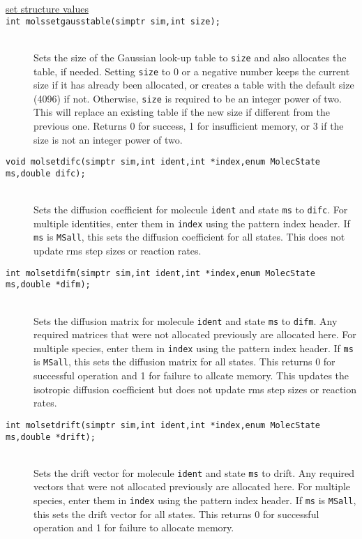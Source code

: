 \documentclass {scrbook}
\newcommand {\ttt} {\texttt}
\begin{document}
\begin{description}
\item[\underline{set structure values}]

\item[\ttt{int molssetgausstable(simptr sim,int size);}]
\hfill \\
Sets the size of the Gaussian look-up table to \ttt{size} and also allocates the table, if needed. Setting \ttt{size} to 0 or a negative number keeps the current size if it has already been allocated, or creates a table with the default size (4096) if not. Otherwise, \ttt{size} is required to be an integer power of two. This will replace an existing table if the new size if different from the previous one. Returns 0 for success, 1 for insufficient memory, or 3 if the size is not an integer power of two.

\item[\ttt{void molsetdifc(simptr sim,int ident,int *index,enum MolecState ms,double difc);}]
\hfill \\
Sets the diffusion coefficient for molecule \ttt{ident} and state \ttt{ms} to \ttt{difc}. For multiple identities, enter them in \ttt{index} using the pattern index header. If \ttt{ms} is \ttt{MSall}, this sets the diffusion coefficient for all states. This does not update rms step sizes or reaction rates.

\item[\ttt{int molsetdifm(simptr sim,int ident,int *index,enum MolecState ms,double *difm);}]
\hfill \\
Sets the diffusion matrix for molecule \ttt{ident} and state \ttt{ms} to \ttt{difm}. Any required matrices that were not allocated previously are allocated here. For multiple species, enter them in \ttt{index} using the pattern index header. If \ttt{ms} is \ttt{MSall}, this sets the diffusion matrix for all states. This returns 0 for successful operation and 1 for failure to allcate memory. This updates the isotropic diffusion coefficient but does not update rms step sizes or reaction rates.

\item[\ttt{int molsetdrift(simptr sim,int ident,int *index,enum MolecState ms,double *drift);}]
\hfill \\
Sets the drift vector for molecule \ttt{ident} and state \ttt{ms} to drift. Any required vectors that were not allocated previously are allocated here. For multiple species, enter them in \ttt{index} using the pattern index header. If \ttt{ms} is \ttt{MSall}, this sets the drift vector for all states. This returns 0 for successful operation and 1 for failure to allocate memory.


\end{description}
\end{document}
